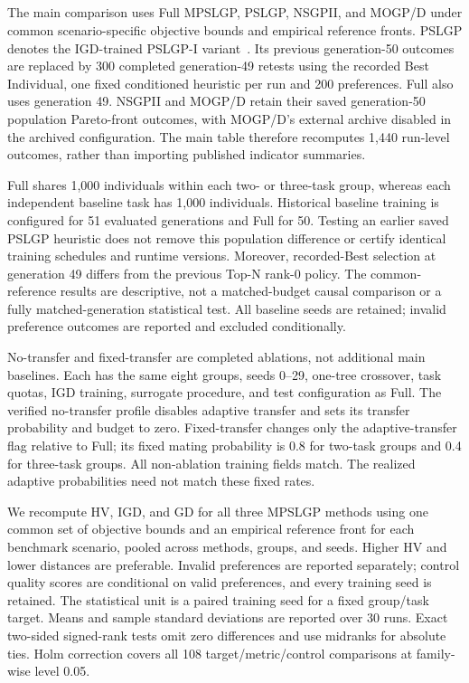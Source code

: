 \subsection{}
\begingroup
\color{resultrevision}
The main comparison uses Full MPSLGP, PSLGP, NSGPII, and MOGP/D under common scenario-specific objective bounds and empirical reference fronts. PSLGP denotes the IGD-trained PSLGP-I variant~\cite{xu2026pslgp}. Its previous generation-50 outcomes are replaced by 300 completed generation-49 retests using the recorded Best Individual, one fixed conditioned heuristic per run and 200 preferences. Full also uses generation 49. NSGPII and MOGP/D retain their saved generation-50 population Pareto-front outcomes, with MOGP/D's external archive disabled in the archived configuration. The main table therefore recomputes 1,440 run-level outcomes, rather than importing published indicator summaries.

Full shares 1,000 individuals within each two- or three-task group, whereas each independent baseline task has 1,000 individuals. Historical baseline training is configured for 51 evaluated generations and Full for 50. Testing an earlier saved PSLGP heuristic does not remove this population difference or certify identical training schedules and runtime versions. Moreover, recorded-Best selection at generation 49 differs from the previous Top-N rank-0 policy. The common-reference results are descriptive, not a matched-budget causal comparison or a fully matched-generation statistical test. All baseline seeds are retained; invalid preference outcomes are reported and excluded conditionally.

No-transfer and fixed-transfer are completed ablations, not additional main baselines. Each has the same eight groups, seeds 0--29, one-tree crossover, task quotas, IGD training, surrogate procedure, and test configuration as Full. The verified no-transfer profile disables adaptive transfer and sets its transfer probability and budget to zero. Fixed-transfer changes only the adaptive-transfer flag relative to Full; its fixed mating probability is 0.8 for two-task groups and 0.4 for three-task groups. All non-ablation training fields match. The realized adaptive probabilities need not match these fixed rates.

We recompute HV, IGD, and GD for all three MPSLGP methods using one common set of objective bounds and an empirical reference front for each benchmark scenario, pooled across methods, groups, and seeds. Higher HV and lower distances are preferable. Invalid preferences are reported separately; control quality scores are conditional on valid preferences, and every training seed is retained. The statistical unit is a paired training seed for a fixed group/task target. Means and sample standard deviations are reported over 30 runs. Exact two-sided signed-rank tests omit zero differences and use midranks for absolute ties. Holm correction covers all 108 target/metric/control comparisons at family-wise level 0.05.

